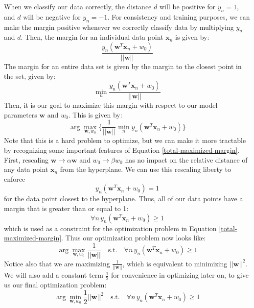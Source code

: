 When we classify our data correctly, the distance $d$ will be positive for $y_{n} = 1$, and $d$ will be negative for $y_{n} = -1$. For consistency and training purposes, we can make the margin positive whenever we correctly classify data by multiplying $y_{n}$ and $d$. Then, the margin for an individual data point $\textbf{x}_{n}$ is given by:
\begin{equation} \label{individual-margin}
	\frac{y_{n}(\textbf{w}^{T}\textbf{x}_{n} + w_{0})}{||\textbf{w}||}
\end{equation}
The margin for an entire data set is given by the margin to the closest point in the set, given by:
\begin{equation} \label{total-margin}
	\min_{n} \frac{y_{n}(\textbf{w}^{T}\textbf{x}_{n} + w_{0})}{||\textbf{w}||}
\end{equation}
Then, it is our goal to maximize this margin with respect to our model parameters $\textbf{w}$ and $w_{0}$. This is given by:
\begin{equation} \label{total-maximized-margin}
	\arg\max_{\textbf{w}, w_{0}} \big\{ \frac{1}{||\textbf{w}||} \min_{n} y_{n}(\textbf{w}^{T}\textbf{x}_{n} + w_{0}) \big\}
\end{equation}
Note that this is a hard problem to optimize, but we can make it more tractable by recognizing some important features of Equation \ref{total-maximized-margin}. First, rescaling $\textbf{w} \rightarrow \alpha \textbf{w}$ and $w_{0} \rightarrow \beta w_{0}$ has no impact on the relative distance of any data point $\textbf{x}_{n}$ from the hyperplane. We can use this rescaling liberty to enforce
\begin{equation} \label{enfore-dist-to-1}
	y_{n}(\textbf{w}^{T}\textbf{x}_{n} + w_{0}) = 1
\end{equation}
for the data point closest to the hyperplane. Thus, all of our data points have a margin that is greater than or equal to 1:
\begin{equation} \label{new-margin-constraint}
	\forall n \, y_{n}(\textbf{w}^{T}\textbf{x}_{n} + w_{0}) \geq 1
\end{equation}
which is used as a constraint for the optimization problem in Equation \ref{total-maximized-margin}. Thus our optimization problem now looks like:
\begin{equation} \label{simplified-maximized-margin-optimization}
	\arg\max_{\textbf{w}, w_{0}} \frac{1}{||\textbf{w}||} \quad \text{s.t.} \quad \forall n \, y_{n}(\textbf{w}^{T}\textbf{x}_{n} + w_{0}) \geq 1
\end{equation}
Notice also that we are maximizing $\frac{1}{||\textbf{w}||}$, which is equivalent to minimizing $||\textbf{w}||^{2}$. We will also add a constant term $\frac{1}{2}$ for convenience in optimizing later on, to give us our final optimization problem:
\begin{equation} \label{final-simplified-maximized-margin-optimization}
	\arg\min_{\textbf{w}, w_{0}} \frac{1}{2} ||\textbf{w}||^{2} \quad \text{s.t.} \quad \forall n \, y_{n}(\textbf{w}^{T}\textbf{x}_{n} + w_{0}) \geq 1
\end{equation}

